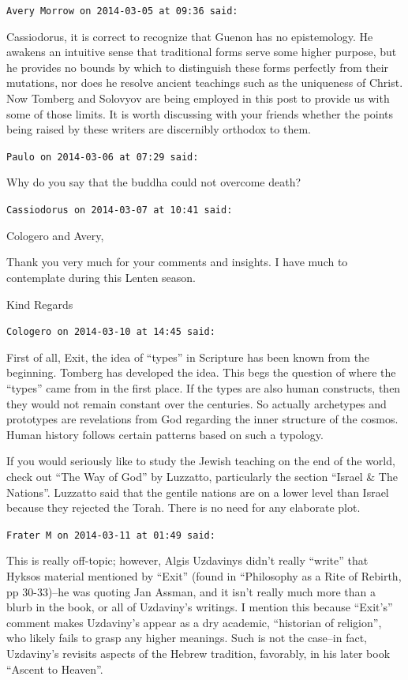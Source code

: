 \begin{footnotesize}
\begin{sffamily}
\texttt{Avery Morrow on 2014-03-05 at 09:36 said:}

Cassiodorus, it is correct to recognize that Guenon has no epistemology. He awakens an intuitive sense that traditional forms serve some higher purpose, but he provides no bounds by which to distinguish these forms perfectly from their mutations, nor does he resolve ancient teachings such as the uniqueness of Christ. Now Tomberg and Solovyov are being employed in this post to provide us with some of those limits. It is worth discussing with your friends whether the points being raised by these writers are discernibly orthodox to them.

\hfill

\texttt{Paulo on 2014-03-06 at 07:29 said:}

Why do you say that the buddha could not overcome death?

\hfill

\texttt{Cassiodorus on 2014-03-07 at 10:41 said:}

Cologero and Avery,

Thank you very much for your comments and insights. I have much to contemplate during this Lenten season.

Kind Regards

\hfill

\texttt{Cologero on 2014-03-10 at 14:45 said:}

First of all, Exit, the idea of ``types'' in Scripture has been known from the beginning. Tomberg has developed the idea. This begs the question of where the ``types'' came from in the first place. If the types are also human constructs, then they would not remain constant over the centuries. So actually archetypes and prototypes are revelations from God regarding the inner structure of the cosmos. Human history follows certain patterns based on such a typology.

If you would seriously like to study the Jewish teaching on the end of the world, check out ``The Way of God'' by Luzzatto, particularly the section ``Israel \& The Nations''. Luzzatto said that the gentile nations are on a lower level than Israel because they rejected the Torah. There is no need for any elaborate plot.

\hfill

\texttt{Frater M on 2014-03-11 at 01:49 said:}

This is really off-topic; however, Algis Uzdavinys didn't really ``write'' that Hyksos material mentioned by ``Exit'' (found in ``Philosophy as a Rite of Rebirth, pp 30-33)--he was quoting Jan Assman, and it isn't really much more than a blurb in the book, or all of Uzdaviny's writings. I mention this because ``Exit's'' comment makes Uzdaviny's appear as a dry academic, ``historian of religion'', who likely fails to grasp any higher meanings. Such is not the case--in fact, Uzdaviny's revisits aspects of the Hebrew tradition, favorably, in his later book ``Ascent to Heaven''.


\end{sffamily}
\end{footnotesize}
